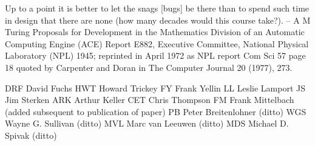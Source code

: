 Up to a point it is better to let the snags [bugs] be there
than to spend such time in design that there are none
(how many decades would this course take?).
-- A M Turing
   Proposals for Development in the Mathematics Division
     of an Automatic Computing Engine (ACE)
   Report E882, Executive Committee, National Physical Laboratory (NPL)
   1945; reprinted in April 1972 as NPL report Com Sci 57
   page 18
   quoted by Carpenter and Doran in The Computer Journal 20 (1977), 273.

DRF David Fuchs
HWT Howard Trickey
FY  Frank Yellin
LL  Leslie Lamport
JS  Jim Sterken
ARK Arthur Keller
CET Chris Thompson
FM  Frank Mittelbach (added subsequent to publication of paper)
PB  Peter Breitenlohner (ditto)
WGS Wayne G. Sullivan (ditto)
MVL Marc van Leeuwen (ditto)
MDS Michael D. Spivak (ditto)
